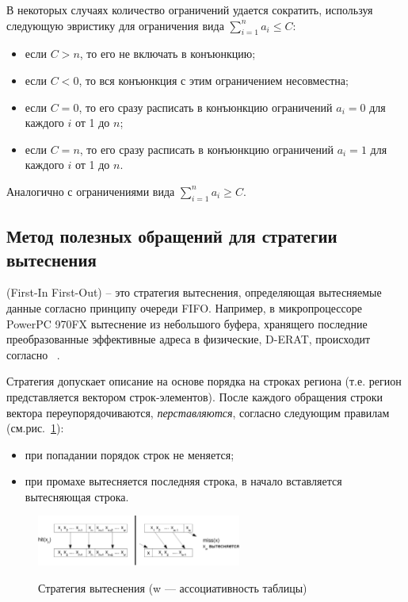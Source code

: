 В некоторых случаях количество ограничений удается сократить, используя следующую эвристику для ограничения вида $\sum_{i=1}^n a_i \leqslant C$:
\begin{itemize}
    \item если $C > n$, то его не включать в конъюнкцию;
    \item если $C < 0$, то вся конъюнкция с этим ограничением несовместна;
    \item если $C = 0$, то его сразу расписать в конъюнкцию ограничений
$a_i = 0$ для каждого $i$ от 1 до $n$;
    \item если $C = n$, то его сразу расписать в конъюнкцию ограничений
$a_i = 1$ для каждого $i$ от 1 до $n$.
\end{itemize}

Аналогично с ограничениями вида $\sum_{i=1}^n a_i \geqslant C$.


\subsection{Метод полезных обращений для стратегии вытеснения \FIFO}

\FIFO (First-In First-Out) -- это стратегия вытеснения, определяющая
вытесняемые данные согласно принципу очереди FIFO. Например, в
микропроцессоре PowerPC 970FX вытеснение из небольшого буфера,
хранящего последние преобразованные эффективные адреса в физические,
D-ERAT, происходит согласно \FIFO~\cite{PowerPC970FXUserManual}.

Стратегия \FIFO допускает описание на основе порядка на строках
региона (т.е. регион представляется вектором строк-элементов). После каждого
обращения строки вектора переупорядочиваются, \emph{перставляются}, согласно следующим правилам
(см.рис.~\ref{fifo1}):
\begin{itemize}
\item при попадании порядок строк не меняется;
\item при промахе вытесняется последняя строка, в начало вставляется вытесняющая строка.
\end{itemize}

\begin{figure}[h] \center
  \includegraphics[width=0.6\textwidth]{2.theor/fifo1}\\
  \caption{Стратегия вытеснения \FIFO (w --- ассоциативность
таблицы)}\label{fifo1}
\end{figure}


